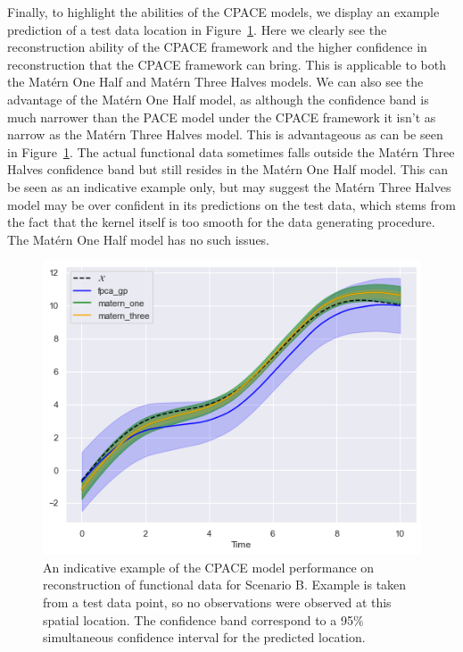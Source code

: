 Finally, to highlight the abilities of the CPACE models, we display an example prediction of a test data location in Figure~\ref{fig:test_ex_B}.
Here we clearly see the reconstruction ability of the CPACE framework and the higher confidence in reconstruction that the CPACE framework can bring.
This is applicable to both the Mat\'ern One Half and Mat\'ern Three Halves models.
We can also see the advantage of the Mat\'ern One Half model, as although the confidence band is much narrower than the PACE model under the CPACE framework it isn't as narrow as the Mat\'ern Three Halves model.
This is advantageous as can be seen in Figure~\ref{fig:test_ex_B}.
The actual functional data sometimes falls outside the Mat\'ern Three Halves confidence band but still resides in the Mat\'ern One Half model.
This can be seen as an indicative example only, but may suggest the Mat\'ern Three Halves model may be over confident in its predictions on the test data, which stems from the fact that the kernel itself is too smooth for the data generating procedure. 
The Mat\'ern One Half model has no such issues.

\begin{figure}
	\centering
	\includegraphics[width=\textwidth]{test_ex_B}
	\caption[An indicative example of the CPACE model performance on reconstruction of functional data for Scenario B.]{An indicative example of the CPACE model performance on reconstruction of functional data for Scenario B. Example is taken from a test data point, so no observations were observed at this spatial location. The confidence band correspond to a 95\% simultaneous confidence interval for the predicted location.}
	\label{fig:test_ex_B}
\end{figure}

